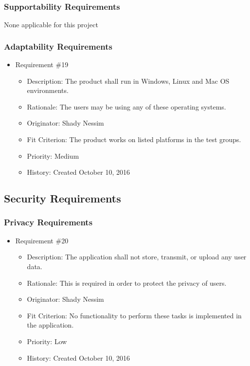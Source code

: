 \documentclass[12pt, titlepage]{article}
\begin{document}
\subsubsection{Supportability Requirements}
None applicable for this project

\subsubsection{Adaptability Requirements}
\begin{itemize} 

\item Requirement \#19
\begin{itemize} 
\item Description: The product shall run in Windows, Linux and Mac OS environments.
\item Rationale: The users may be using any of these operating systems.
\item Originator: Shady Nessim 
\item Fit Criterion: The product works on listed platforms in the test groups.
\item Priority: Medium 
\item History: Created October 10, 2016
\end{itemize}

\end{itemize}

\subsection{Security Requirements}
\subsubsection{Privacy Requirements}
\begin{itemize} 

\item Requirement \#20
\begin{itemize} 
\item Description: The application shall not store, transmit, or upload any user data.
\item Rationale: This is required in order to protect the privacy of users.
\item Originator: Shady Nessim
\item Fit Criterion: No functionality to perform these tasks is implemented in the application. 
\item Priority: Low 
\item History: Created October 10, 2016
\end{itemize}

\end{itemize}
\end{document}
